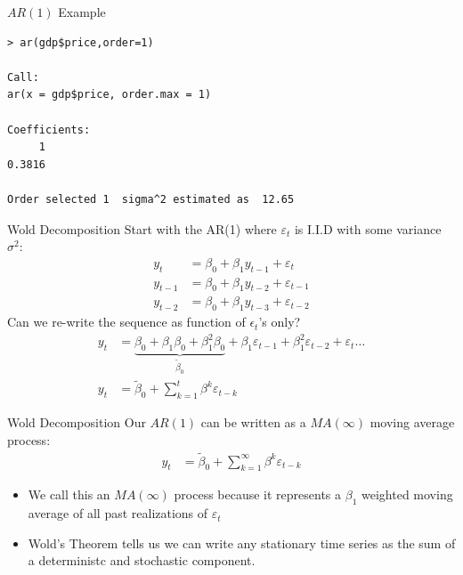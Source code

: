 \documentclass[aspectratio=169]{beamer}
\begin{document}
\begin{frame}[fragile]{$AR(1)$ Example}
\begin{verbatim}
> ar(gdp$price,order=1)

Call:
ar(x = gdp$price, order.max = 1)

Coefficients:
     1  
0.3816  

Order selected 1  sigma^2 estimated as  12.65
\end{verbatim}
\end{frame}

\begin{frame}{Wold Decomposition}
Start with the AR(1) where $\varepsilon_{t}$ is I.I.D with some variance $\sigma^2$:
\begin{align*}
y_t &= \beta_0 + \beta_1 y_{t-1} + \varepsilon_t\\
y_{t-1} &= \beta_0 + \beta_1 y_{t-2} + \varepsilon_{t-1}\\
y_{t-2} &= \beta_0 + \beta_1 y_{t-3} + \varepsilon_{t-2}
\end{align*}
Can we re-write the sequence as function of $\epsilon_t$'s only?
\begin{align*}
y_t &= \underbrace{\beta_0 + \beta_1 \beta_0 + \beta_1^2 \beta_0}_{\widetilde{\beta}_0} + \beta_1 \varepsilon_{t-1} + \beta_1^2 \varepsilon_{t-2} +  \varepsilon_t \ldots \\
y_t &= \widetilde{\beta}_0 + \sum_{k=1}^{t} \beta^{k} \varepsilon_{t-k}
\end{align*}
\end{frame}


\begin{frame}{Wold Decomposition}
Our $AR(1)$ can be written as a $MA(\infty)$ \alert{moving average process}:
\begin{align*}
y_t &= \widetilde{\beta}_0 + \sum_{k=1}^{\infty} \beta^{k} \varepsilon_{t-k}
\end{align*}
\begin{itemize}
    \item We call this an $MA(\infty)$ process because it represents a $\beta_1$ weighted moving average of \alert{all past realizations} of $\varepsilon_t$
    \item Wold's Theorem tells us we can write any \alert{stationary} time series as the sum of a \alert{deterministc} and \alert{stochastic} component.
\end{itemize}
\end{frame}
\end{document}
